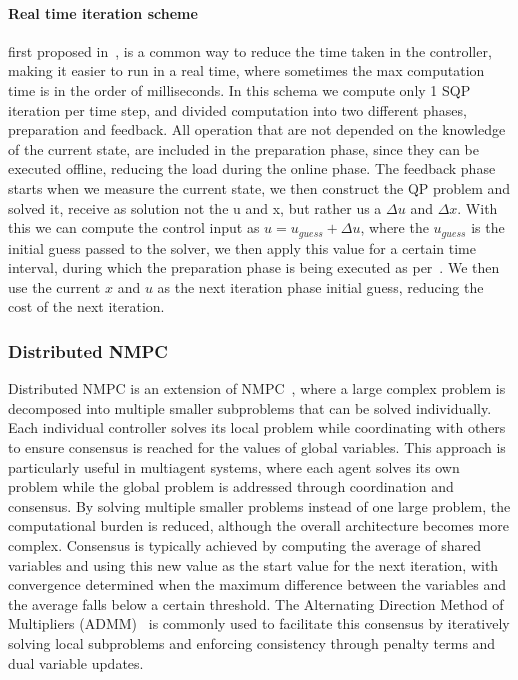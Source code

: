 \paragraph{Real time iteration scheme} first proposed in~\cite{diehl2002real}, is a common way to reduce the time taken in the controller, making it easier to run in a real time, where sometimes the max computation time is in the order of milliseconds. In this schema we compute only 1 SQP iteration per time step, and divided computation into two different phases, preparation and feedback. All operation that are not depended on the knowledge of the current state, are included in the preparation phase, since they can be executed offline, reducing the load during the online phase. The feedback phase starts when we measure the current state, we then construct the QP problem and solved it, receive as solution not the u and x, but rather us a $\Delta u$ and $\Delta x$. With this we can compute the control input as $u = u_{guess} + \Delta u$, where the $u_{guess}$ is the initial guess passed to the solver, we then apply this value for a certain time interval, during which the preparation phase is being executed as per~\cite{diehl2005real}. We then use the current $x$ and $u$ as the next iteration phase initial guess, reducing the cost of the next iteration. 

\subsubsection{Distributed NMPC}

Distributed NMPC is an extension of NMPC~\cite{muller2013distributed}, where a large complex problem is decomposed into multiple smaller subproblems that can be solved individually. Each individual controller solves its local problem while coordinating with others to ensure consensus is reached for the values of global variables. This approach is particularly useful in multiagent systems, where each agent solves its own problem while the global problem is addressed through coordination and consensus. By solving multiple smaller problems instead of one large problem, the computational burden is reduced, although the overall architecture becomes more complex. Consensus is typically achieved by computing the average of shared variables and using this new value as the start value for the next iteration, with convergence determined when the maximum difference between the variables and the average falls below a certain threshold. The Alternating Direction Method of Multipliers (ADMM)~\cite{boyd2011distributed} is commonly used to facilitate this consensus by iteratively solving local subproblems and enforcing consistency through penalty terms and dual variable updates.
